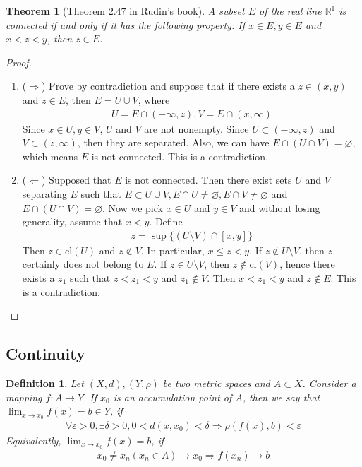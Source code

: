 \documentclass[12pt,leqno]{amsart}
\newtheorem{definition}{Definition}[section]
\newtheorem{theorem}{Theorem}[section]
\theoremstyle{definition}
\numberwithin{equation}{subsection}
\begin{document}
\medskip

\newpage
\begin{theorem}[Theorem 2.47 in Rudin's book]
A subset $E$ of the real line $\mathbb{R}^1$ is connected if and only if it has the following property: If $x\in E, y\in E$ and $x<z<y$, then $z\in E$.
\end{theorem}
\begin{proof}
~\begin{enumerate}
    \item ($\Rightarrow$) Prove by contradiction and suppose that if there exists a $z\in (x,y)$ and $z\in E$, then $E = U\cup V$, where 
    \begin{align*}
        U = E\cap (-\infty,z), V = E\cap(x,\infty)
    \end{align*}
    Since $x\in U, y\in V$, $U$ and $V$ are not nonempty. Since $U\subset (-\infty, z)$ and $V\subset (z,\infty)$, then they are separated. Also, we can have $E\cap(U\cap V) = \varnothing$, which means $E$ is not connected. This is a contradiction.
    \item ($\Leftarrow$) Supposed that $E$ is not connected. Then there exist sets $U$ and $V$ separating $E$ such that $E\subset U\cup V, E\cap U\neq\varnothing, E\cap V\neq\varnothing$ and $E\cap(U\cap V) = \varnothing$. Now we pick $x\in U$ and $y\in V$ and without losing generality, assume that $x < y$. Define 
    \begin{align*}
        z = \sup\{(U\setminus V)\cap[x,y]\}
    \end{align*}
    Then $z\in \text{cl}(U)$ and $z\notin V$. In particular, $x\leq z < y$. If $z\notin U\setminus V$, then $z$ certainly does not belong to $E$. If $z\in U\setminus V$, then $z\notin \text{cl}(V)$, hence there exists a $z_1$ such that $z<z_1<y$ and $z_1\notin V$. Then $x<z_1<y$ and $z\notin E$. This is a contradiction.
\end{enumerate}
\end{proof}


\medskip

\subsection{Continuity}
\begin{definition}
Let $(X,d), (Y,\rho)$ be two metric spaces and $A\subset X$. Consider a mapping $f:A\to Y$. If $x_0$ is an accumulation point of $A$, then we say that $\lim_{x\to x_0}f(x) = b \in Y$, if 
\begin{align*}
    \forall\varepsilon>0, \exists\delta>0, 0<d(x,x_0)<\delta \Rightarrow \rho(f(x),b)<\varepsilon
\end{align*}
Equivalently, $\lim_{x\to x_0}f(x) = b$, if
\begin{align*}
    x_0 \neq x_n (x_n\in A) \to x_0 \Rightarrow f(x_n) \to b
\end{align*}
\end{definition}
\end{document}
